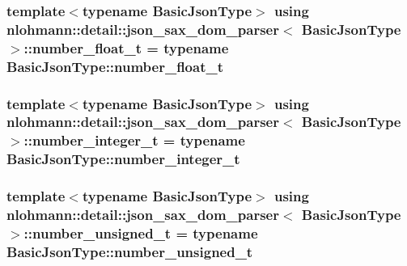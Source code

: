 \subsubsection[{\texorpdfstring{number\+\_\+float\+\_\+t}{number_float_t}}]{\setlength{\rightskip}{0pt plus 5cm}template$<$typename Basic\+Json\+Type$>$ using {\bf nlohmann\+::detail\+::json\+\_\+sax\+\_\+dom\+\_\+parser}$<$ Basic\+Json\+Type $>$\+::{\bf number\+\_\+float\+\_\+t} =  typename Basic\+Json\+Type\+::number\+\_\+float\+\_\+t}\hypertarget{classnlohmann_1_1detail_1_1json__sax__dom__parser_ad8da3aad0147b18b3cb76868480300fe}{}\label{classnlohmann_1_1detail_1_1json__sax__dom__parser_ad8da3aad0147b18b3cb76868480300fe}
\subsubsection[{\texorpdfstring{number\+\_\+integer\+\_\+t}{number_integer_t}}]{\setlength{\rightskip}{0pt plus 5cm}template$<$typename Basic\+Json\+Type$>$ using {\bf nlohmann\+::detail\+::json\+\_\+sax\+\_\+dom\+\_\+parser}$<$ Basic\+Json\+Type $>$\+::{\bf number\+\_\+integer\+\_\+t} =  typename Basic\+Json\+Type\+::number\+\_\+integer\+\_\+t}\hypertarget{classnlohmann_1_1detail_1_1json__sax__dom__parser_a3d5cd67d179aa7422ce90e54984a441e}{}\label{classnlohmann_1_1detail_1_1json__sax__dom__parser_a3d5cd67d179aa7422ce90e54984a441e}
\subsubsection[{\texorpdfstring{number\+\_\+unsigned\+\_\+t}{number_unsigned_t}}]{\setlength{\rightskip}{0pt plus 5cm}template$<$typename Basic\+Json\+Type$>$ using {\bf nlohmann\+::detail\+::json\+\_\+sax\+\_\+dom\+\_\+parser}$<$ Basic\+Json\+Type $>$\+::{\bf number\+\_\+unsigned\+\_\+t} =  typename Basic\+Json\+Type\+::number\+\_\+unsigned\+\_\+t}\hypertarget{classnlohmann_1_1detail_1_1json__sax__dom__parser_a90f19b272530a479db81db11be2ea15c}{}\label{classnlohmann_1_1detail_1_1json__sax__dom__parser_a90f19b272530a479db81db11be2ea15c}
